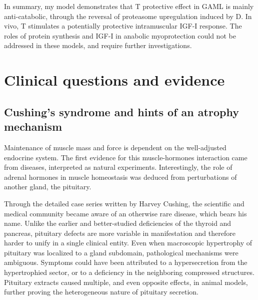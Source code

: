\documentclass[12pt,english]{report}\usepackage[]{graphicx}\usepackage[]{color}
\providecommand{\printnomenclature}{\printglossary}
\begin{document}
In summary, my model demonstrates that T protective effect in GAML
is mainly anti-catabolic, through the reversal of proteasome upregulation
induced by D. In vivo, T stimulates a potentially protective intramuscular
IGF-I response. The roles of protein synthesis and IGF-I in anabolic
myoprotection could not be addressed in these models, and require
further investigations. \pagebreak{}

\tableofcontents{}\pagebreak{}

\listoftables
\pagebreak{}

\listoffigures
\pagebreak{}

\printnomenclature[2in]{}

\pagestyle{preamblepages}
\clearpage
\pagestyle{contentpages}
\setcounter{page}{1}


\chapter{Clinical questions and evidence}


\section{Cushing's syndrome and hints of an atrophy mechanism}

Maintenance of muscle mass and force is dependent on the well-adjusted
endocrine system. The first evidence for this muscle-hormones interaction
came from diseases, interpreted as natural experiments. Interestingly,
the role of adrenal hormones in muscle homeostasis was deduced from
perturbations of another gland, the pituitary.

Through the detailed case series written by Harvey Cushing\citep{cushing1912pituitary},
the scientific and medical community became aware of an otherwise
rare disease, which bears his name. Unlike the earlier and better-studied
deficiencies of the thyroid and pancreas, pituitary defects are more
variable in manifestation and therefore harder to unify in a single
clinical entity. Even when macroscopic hypertrophy of pituitary was
localized to a gland subdomain, pathological mechanisms were ambiguous.
Symptoms could have been attributed to a hypersecretion from the hypertrophied
sector, or to a deficiency in the neighboring compressed structures.
Pituitary extracts caused multiple, and even opposite effects, in
animal models\citep{schafer1899physiological}, further proving the
heterogeneous nature of pituitary secretion.
\end{document}
